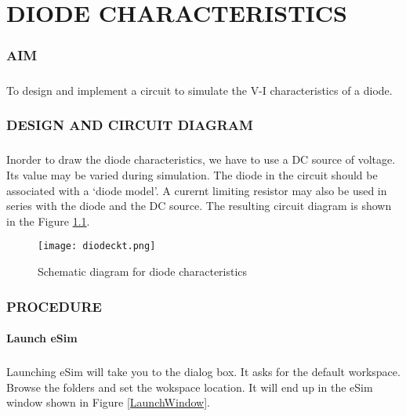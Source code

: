 \chapter{DIODE CHARACTERISTICS}

\subsection*{AIM}
\paragraph{}To design and implement a circuit to simulate the V-I characteristics of a diode.

\subsection*{DESIGN AND CIRCUIT DIAGRAM}
\paragraph{}

Inorder to draw the diode characteristics, we have to use a DC source of voltage. Its value may be varied during simulation. The diode in the circuit should be associated with a `diode model'. A curernt limiting resistor may also be used in series with the diode and the DC source. The resulting circuit diagram is shown in the Figure \ref{diodeckt}.
\begin{figure}[]
\centering
\texttt{[image: diodeckt.png]}
\caption{Schematic diagram for diode characteristics}
\label{diodeckt}
\end{figure}

\subsection*{PROCEDURE}

\subsubsection{Launch eSim}

\paragraph{}
 Launching eSim will take you to the dialog box. It asks for the default workspace. Browse the folders and set the wokspace location. It will end up in the eSim window shown in Figure \ref{LaunchWindow}.
 
